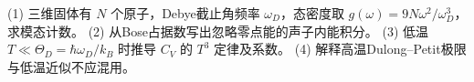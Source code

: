 (1) 三维固体有 \(N\) 个原子，Debye截止角频率 \(\omega_D\)，态密度取 \(g(\omega)=9N\omega^2/\omega_D^3\)，求模态计数。
(2) 从Bose占据数写出忽略零点能的声子内能积分。
(3) 低温 \(T\ll\Theta_D=\hbar\omega_D/k_B\) 时推导 \(C_V\) 的 \(T^3\) 定律及系数。
(4) 解释高温Dulong–Petit极限与低温近似不应混用。
